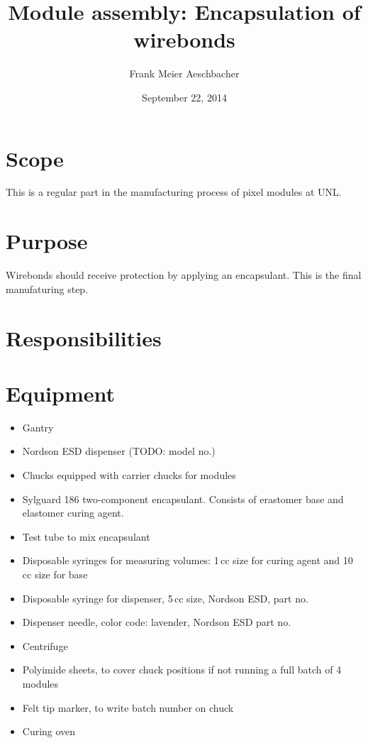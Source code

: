 \documentclass[12pt]{unlsilabsop}
\title{Module assembly: Encapsulation of wirebonds}
\date{September 22, 2014}
\author{Frank Meier Aeschbacher}
\begin{document}
\maketitle

\section{Scope}
This is a regular part in the manufacturing process of pixel modules at UNL.

\section{Purpose}
Wirebonds should receive protection by applying an encapsulant. This is the final manufaturing step.


\section{Responsibilities}

\section{Equipment}

\begin{itemize}
    \item Gantry
    \item Nordson ESD dispenser (TODO: model no.)
    \item Chucks equipped with carrier chucks for modules
    \item Sylguard 186 two-component encapsulant. Consists of erastomer base and elastomer curing agent.
    \item Test tube to mix encapsulant
    \item Disposable syringes for measuring volumes: 1\,cc size for curing agent and 10\,cc size for base
    \item Disposable syringe for dispenser, 5\,cc size, Nordson ESD, part no.
    \item Dispenser needle, color code: lavender, Nordson ESD part no.
    \item Centrifuge
    \item Polyimide sheets, to cover chuck positions if not running a full batch of 4 modules
    \item Felt tip marker, to write batch number on chuck
    \item Curing oven
\end{itemize}
\end{document}
